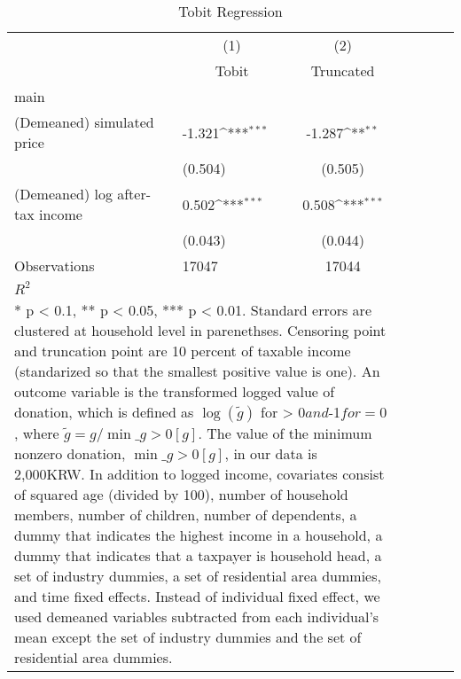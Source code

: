 \begin{table}[htbp]\centering
\def\sym#1{\ifmmode^{#1}\else\(^{#1}\)\fi}
\caption{Tobit Regression}
\begin{tabular}{l*{2}{lcc}}
\toprule
                    &\multicolumn{1}{c}{(1)}&\multicolumn{1}{c}{(2)}\\
                    &\multicolumn{1}{c}{Tobit}&\multicolumn{1}{c}{Truncated}\\
\midrule
main                &                     &                     \\
(Demeaned) simulated price&      -1.321\sym{***}&      -1.287\sym{**} \\
                    &     (0.504)         &     (0.505)         \\
(Demeaned) log after-tax income&       0.502\sym{***}&       0.508\sym{***}\\
                    &     (0.043)         &     (0.044)         \\
\midrule
Observations        &       17047         &       17044         \\
\(R^{2}\)           &                     &                     \\
\bottomrule
\multicolumn{3}{l}{\footnotesize \parbox{15cm}{* p < 0.1, ** p < 0.05, *** p < 0.01. Standard errors are clustered at household level in parenethses. Censoring point and truncation point are 10 percent of taxable income (standarized so that the smallest positive value is one). An outcome variable is the transformed logged value of donation, which is defined as $\log(\tilde{g})$ for  > 0$ and $-1$ for =0$, where $\tilde{g}=g/\min\_{g>0}[g]$. The value of the minimum nonzero donation, $\min\_{g>0}[g]$, in our data is 2,000KRW. In addition to logged income, covariates consist of squared age (divided by 100), number of household members, number of children, number of dependents, a dummy that indicates the highest income in a household, a dummy that indicates that a taxpayer is household head, a set of industry dummies, a set of residential area dummies, and time fixed effects. Instead of individual fixed effect, we used demeaned variables subtracted from each individual's mean except the set of industry dummies and the set of residential area dummies.}}\\
\end{tabular}
\end{table}
